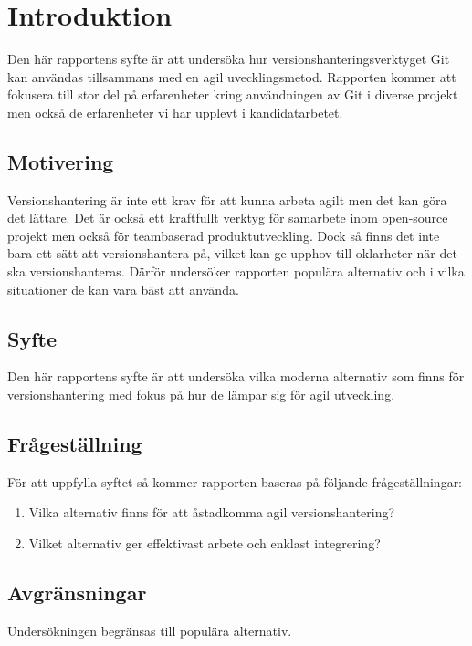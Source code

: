 \section{Introduktion}
\label{sec:bjorn-introduction}

Den här rapportens syfte är att undersöka hur versionshanteringsverktyget Git kan användas tillsammans med en agil uvecklingsmetod. Rapporten kommer att fokusera till stor del på erfarenheter kring användningen av Git i diverse projekt men också de erfarenheter vi har upplevt i kandidatarbetet.

\subsection{Motivering}
\label{subsec:motivation}

Versionshantering är inte ett krav för att kunna arbeta agilt men det kan göra det lättare. Det är också ett kraftfullt verktyg för samarbete inom open-source projekt men också för teambaserad produktutveckling. Dock så finns det inte bara ett sätt att versionshantera på, vilket kan ge upphov till oklarheter när det ska versionshanteras. Därför undersöker rapporten populära alternativ och i vilka situationer de kan vara bäst att använda.

\subsection{Syfte}
\label{subsec:reason}
Den här rapportens syfte är att undersöka vilka moderna alternativ som finns för versionshantering med fokus på hur de lämpar sig för agil utveckling.

\subsection{Frågeställning}
\label{subsec:research-questions}

För att uppfylla syftet så kommer rapporten baseras på följande frågeställningar:

\begin{enumerate}
\item Vilka alternativ finns för att åstadkomma agil versionshantering?

\item Vilket alternativ ger effektivast arbete och enklast integrering?
\end{enumerate}




\subsection{Avgränsningar}
\label{subsec:delimitations}

Undersökningen begränsas till populära alternativ.